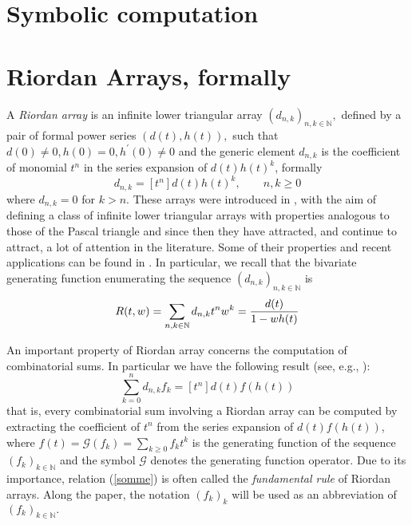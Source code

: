 
\section{Symbolic computation}



\section{Riordan Arrays, formally}

A \textit{Riordan array} is an infinite lower triangular array
$(d_{n,k} )_{n,k \in \mathbb{N}},$ defined by a pair of formal power series
$(d(t),h(t)),$ such that $d(0)\neq 0, h(0)=0, h^\prime(0)\neq0$ and the generic
element $d_{n,k}$ is the coefficient of monomial $t^{n}$ in the series
expansion of $d(t)h(t)^{k}$, formally
\begin{displaymath}
    d_{n,k}=[t^n]d(t)h(t)^k, \qquad n,k \geq 0
\end{displaymath}
where $d_{n,k}=0$ for $k>n.$ These arrays were introduced in
\citep{SHAPIRO1991229}, with the aim of defining a class of infinite lower
triangular arrays with properties analogous to those of the Pascal triangle and
since then they have attracted, and continue to attract, a lot of attention in
the literature. Some of their properties  and recent applications can be found
in \citep{LUZON201475,MRSV97}. In particular, we recall that the bivariate generating
function enumerating the sequence $(d_{n,k} )_{n,k \in\mathbb{N}}$ is
\begin{equation}
    \label{bgf}
    R(t,w) = \sum_{n,k \in\mathbb{N}}{d_{n,k} t^n w^k} = {d(t) \over 1-wh(t)}
\end{equation}

An important property of Riordan array concerns the computation of
combinatorial sums.  In particular we have the following result (see, e.g.,
\citep{LUZON2012631,Merlini:2009:CSI:2653507.2654195,SPRUGNOLI1994267}):
\begin{equation}
    \label{somme}
    \sum_{k=0}^n d_{n,k}f_k=[t^n]d(t)f(h(t))
\end{equation}
that is, every combinatorial sum involving a Riordan array can be computed by
extracting the coefficient of $t^n$ from the series expansion of $d(t)f(h(t))$,
where $f(t)=\mathcal{G}(f_k)=\sum_{k\geq 0}f_kt^k$ is the generating function of the
sequence $(f_k)_{k \in\mathbb{N}}$ and the symbol $\mathcal{G}$ denotes the generating function
operator. Due to its importance, relation (\ref{somme}) is often called the
\textit{fundamental rule} of Riordan arrays.  Along the paper, the notation
$(f_k)_{k}$ will be used as an abbreviation of $(f_k)_{k\in\mathbb{N}}.$

